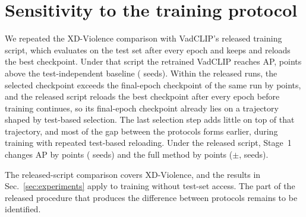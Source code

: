 
\appendix

\section{Sensitivity to the training protocol}
\label{app:protocol}



We repeated the XD-Violence comparison with VadCLIP's released training script, which evaluates on the test set after every epoch and keeps and reloads the best checkpoint. Under that script the retrained VadCLIP reaches \xdRelBase{} AP, \protoGapMean{} points above the test-independent baseline (\protoGapPos{} seeds). Within the released runs, the selected checkpoint exceeds the final-epoch checkpoint of the same run by \relLiftMean{} points, and the released script reloads the best checkpoint after every epoch before training continues, so its final-epoch checkpoint already lies on a trajectory shaped by test-based selection. The last selection step adds little on top of that trajectory, and most of the gap between the protocols forms earlier, during training with repeated test-based reloading. Under the released script, Stage~1 changes AP by \relStageOneMean{} points (\relStageOnePos{} seeds) and the full method by \relTMean{} points ($\pm$\relTSd, \relTPos{} seeds).

The released-script comparison covers XD-Violence, and the results in Sec.~\ref{sec:experiments} apply to training without test-set access. The part of the released procedure that produces the difference between protocols remains to be identified.
